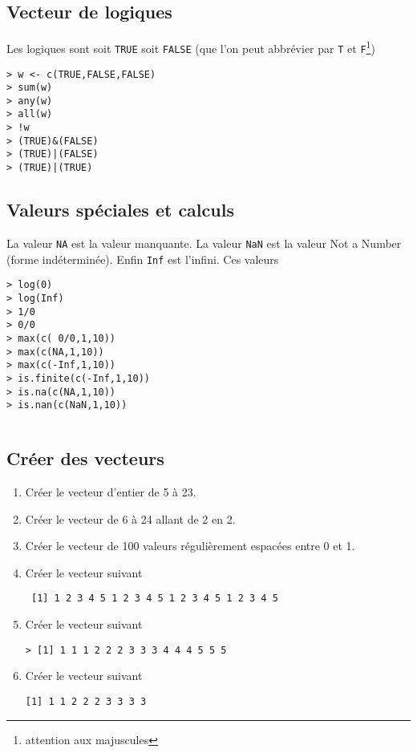\documentclass[a4paper,10pt,french]{article}
\newcommand{\code}[1]{\texttt{#1}}
\begin{document}
\subsection{Vecteur de logiques}
Les logiques sont soit \code{TRUE} soit \code{FALSE} (que l'on peut abbrévier par \code{T} et \code{F}\footnote{attention aux majuscules})
\begin{verbatim}
> w <- c(TRUE,FALSE,FALSE)
> sum(w)
> any(w)
> all(w)
> !w
> (TRUE)&(FALSE)
> (TRUE)|(FALSE)
> (TRUE)|(TRUE)
\end{verbatim}

\subsection{Valeurs spéciales et  calculs}
La valeur \code{NA} est la valeur manquante.
La valeur \code{NaN} 
est la valeur \og Not a Number\fg{} (forme indéterminée). Enfin \code{Inf} est l'infini. Ces valeurs
\begin{verbatim}
> log(0)
> log(Inf)
> 1/0
> 0/0
> max(c( 0/0,1,10))
> max(c(NA,1,10))
> max(c(-Inf,1,10))
> is.finite(c(-Inf,1,10))
> is.na(c(NA,1,10))
> is.nan(c(NaN,1,10))
\end{verbatim}

\begin{verbatim}

\end{verbatim}
\subsection{Créer des vecteurs}
\begin{enumerate}
\item Créer le vecteur d'entier de 5 à 23.
\item Créer le vecteur de 6 à 24 allant de 2 en 2.
\item Créer le vecteur de 100 valeurs régulièrement espacées entre 0 et 1.
\item Créer le vecteur suivant
\begin{verbatim}
 [1] 1 2 3 4 5 1 2 3 4 5 1 2 3 4 5 1 2 3 4 5
\end{verbatim}
\item Créer le vecteur suivant
\begin{verbatim}
> [1] 1 1 1 2 2 2 3 3 3 4 4 4 5 5 5
\end{verbatim}
\item Créer le vecteur suivant
\begin{verbatim}
[1] 1 1 2 2 2 3 3 3 3
\end{verbatim}
\end{enumerate}
\end{document}
